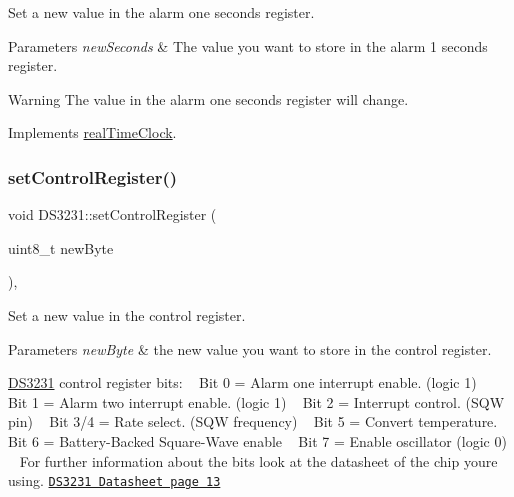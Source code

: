 Set a new value in the alarm one seconds register. 


\begin{DoxyParams}{Parameters}
{\em new\+Seconds} & The value you want to store in the alarm 1 seconds register. \\
\hline
\end{DoxyParams}
\begin{DoxyWarning}{Warning}
The value in the alarm one seconds register will change. 
\end{DoxyWarning}


Implements \mbox{\hyperlink{classreal_time_clock_a448cbe8ab7f6649ee32eeb415721707f}{real\+Time\+Clock}}.

\mbox{\label{class_d_s3231_a1151a22a8dd47470b22562cedae114e9}} 
\subsubsection{\texorpdfstring{set\+Control\+Register()}{setControlRegister()}}
{\footnotesize\ttfamily void D\+S3231\+::set\+Control\+Register (\begin{DoxyParamCaption}\item[{uint8\+\_\+t}]{new\+Byte }\end{DoxyParamCaption})\hspace{0.3cm}{\ttfamily [override]}, {\ttfamily [virtual]}}



Set a new value in the control register. 


\begin{DoxyParams}{Parameters}
{\em new\+Byte} & the new value you want to store in the control register.\\
\hline
\end{DoxyParams}
\mbox{\hyperlink{class_d_s3231}{D\+S3231}} control register bits\+: ~\newline
 Bit 0 = Alarm one interrupt enable. (logic 1) ~\newline
 Bit 1 = Alarm two interrupt enable. (logic 1) ~\newline
 Bit 2 = Interrupt control. (S\+QW pin) ~\newline
 Bit 3/4 = Rate select. (S\+QW frequency) ~\newline
 Bit 5 = Convert temperature. ~\newline
 Bit 6 = Battery-\/\+Backed Square-\/\+Wave enable ~\newline
 Bit 7 = Enable oscillator (logic 0) ~\newline
 For further information about the bits look at the datasheet of the chip you\textquotesingle{}re using. \href{https://datasheets.maximintegrated.com/en/ds/DS3231.pdf}{\tt D\+S3231 Datasheet page 13} 

